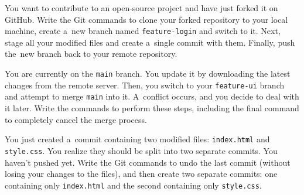 \documentclass[11pt,a4paper,addpoints]{exam}
\begin{document}
\cellwidth{2.75cm}
\noindent \gradetable[h]

\vspace{0.8cm}

\begin{questions}

\question[2] 
You want to contribute to an open-source project and have just forked it on GitHub. Write the Git commands to clone your forked repository to your local machine, create a~new branch named \texttt{feature-login} and switch to it. Next, stage all your modified files and create a~single commit with them. Finally, push the~new branch back to your remote repository.
\fillwithdottedlines{6cm}

\question[2] 
You are currently on the \texttt{main} branch. You update it by downloading the latest changes from the remote server. Then, you switch to your \texttt{feature-ui} branch and attempt to merge \texttt{main} into it. A~conflict occurs, and you decide to deal with it later. Write the commands to perform these steps, including the final command to completely cancel the merge process.
\fillwithdottedlines{6cm}

\newpage

\question[1] 
You just created a~commit containing two modified files: \texttt{index.html} and \texttt{style.css}. You realize they should be split into two separate commits. You haven't pushed yet. Write the Git commands to undo the last commit (without losing your changes to the files), and then create two separate commits: one containing only \texttt{index.html} and the second containing only \texttt{style.css}.
\fillwithdottedlines{7cm}

\end{questions}
\end{document}
